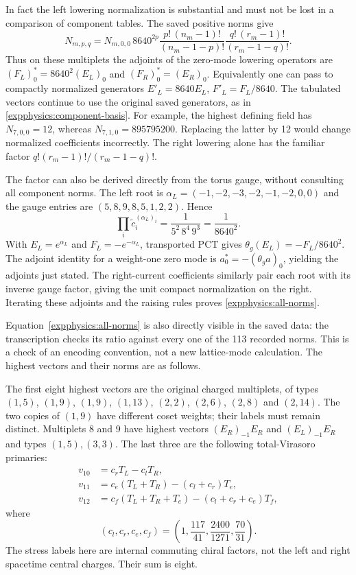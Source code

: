 In fact the left lowering normalization is substantial and must not
be lost in a comparison of component tables. The saved positive norms
give
\begin{equation}
 \boxed{\displaystyle
 N_{m,p,q}=N_{m,0,0}\,8640^{2p}
 \frac{p!\,(n_m-1)!}{(n_m-1-p)!}
 \frac{q!\,(r_m-1)!}{(r_m-1-q)!}.}
 \label{expphysics:all-norms}
\end{equation}
Thus on these multiplets the adjoints of the zero-mode lowering
operators are $(F_L)_0^*=8640^2(E_L)_0$ and
$(F_R)_0^*=(E_R)_0$. Equivalently one can pass to compactly normalized
generators $E'_L=8640E_L$, $F'_L=F_L/8640$. The tabulated vectors
continue to use the original saved generators, as in
\eqref{expphysics:component-basis}. For example, the highest defining
field has $N_{7,0,0}=12$, whereas $N_{7,1,0}=895795200$.
Replacing the latter by 12 would change normalized coefficients
incorrectly. The right lowering alone has the familiar
factor $q!(r_m-1)!/(r_m-1-q)!$.

The factor can also be derived directly from the torus gauge,
without consulting all component norms. The left root is
$\alpha_L=(-1,-2,-3,-2,-1,-2,0,0)$ and the gauge entries are
$(5,8,9,8,5,1,2,2)$. Hence
\[
 \prod_i\widetilde c_i^{(\alpha_L)_i}
 =\frac1{5^2\,8^4\,9^3}=\frac1{8640^2}.
\]
With $E_L=e^{\alpha_L}$ and $F_L=-e^{-\alpha_L}$, transported
PCT gives $\theta_g(E_L)=-F_L/8640^2$.
The adjoint identity for a weight-one zero mode is
$a_0^*=-(\theta_ga)_0$, yielding the adjoints just stated.
The right-current coefficients similarly pair each root with its
inverse gauge factor, giving the unit compact normalization on
the right. Iterating these adjoints and the raising rules proves
\eqref{expphysics:all-norms}.

Equation~\eqref{expphysics:all-norms} is also directly visible in the
saved data: the transcription checks its ratio against every one of
the 113 recorded norms. This is a check of an encoding convention,
not a new lattice-mode calculation. The highest vectors and their
norms are as follows.



The first eight highest vectors are the original charged multiplets,
of types $(1,5)$, $(1,9)$, $(1,9)$, $(1,13)$, $(2,2)$,
$(2,6)$, $(2,8)$ and $(2,14)$.
The two copies of $(1,9)$ have different coset weights; their labels
must remain distinct. Multiplets 8 and 9 have highest vectors
$(E_R)_{-1}E_R$ and $(E_L)_{-1}E_R$ and types $(1,5),(3,3)$.
The last three are the following total-Virasoro primaries:
\begin{align}
 v_{10}&=c_rT_L-c_lT_R,\\
 v_{11}&=c_e(T_L+T_R)-(c_l+c_r)T_e,\\
 v_{12}&=c_f(T_L+T_R+T_e)-(c_l+c_r+c_e)T_f,
 \label{expphysics:stress-differences}
\end{align}
where
\[
 (c_l,c_r,c_e,c_f)=
 \left(1,\frac{117}{41},\frac{2400}{1271},\frac{70}{31}\right).
\]
The stress labels here are internal commuting chiral factors, not
the left and right spacetime central charges. Their sum is eight.

